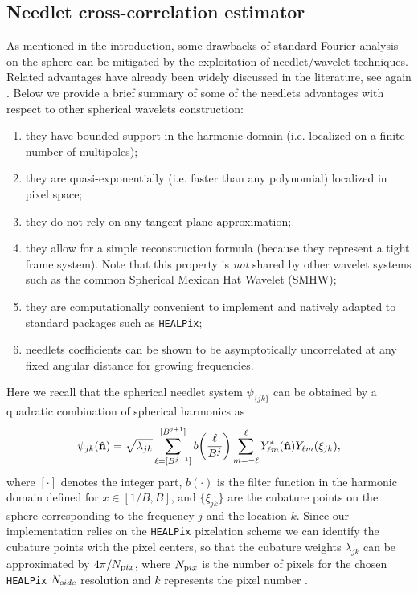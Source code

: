 
\subsection{Needlet cross-correlation estimator}
\label{subsec:needcorr}
As mentioned in the introduction, some drawbacks of standard Fourier analysis on the sphere can be mitigated by the exploitation of needlet/wavelet techniques. Related advantages have already been widely discussed in the literature, see again \cite{Marinucci2007,Lan2008,Donzelli2012,Troja2014,Marinucci2011,Durastanti2014}.
Below we provide a brief summary of some of the needlets advantages with respect to other spherical wavelets construction: 
%
\begin{enumerate}
\item{they have bounded support in the harmonic domain (i.e. localized on a finite number of multipoles);}
\item{they are quasi-exponentially (i.e. faster than any polynomial) localized in pixel space;}
\item{they do not rely on any tangent plane approximation;}
\item{they allow for a simple reconstruction formula (because they represent a tight frame system). Note that this property is \emph{not} shared by other wavelet systems such as the common Spherical Mexican Hat Wavelet (SMHW);}
\item{they are computationally convenient to implement and natively adapted to standard packages such as \texttt{HEALPix};}
\item{needlets coefficients can be shown to be asymptotically uncorrelated at any fixed angular distance for growing frequencies.}
\end{enumerate}
%
Here we recall that the spherical needlet system $\psi_{\{jk\}}$ can be obtained by a quadratic combination of spherical harmonics as
%
\begin{equation}
\label{eqn:needfunc}
\psi_{jk}(\nver) = \sqrt{\lambda_{jk}} \sum_{\ell=[B^{j-1}]}^{[B^{j+1}]} b\biggl(\frac{\ell}{B^{j}}\biggr)\sum_{m=-\ell}^{\ell}Y^*_{\ell m}(\nver)Y_{\ell m}(\xi_{jk}),
\end{equation}
%
where $[\cdot]$ denotes the integer part, $b(\cdot)$ is the filter function in the harmonic domain defined for $x\in [1/B,B]$, and $\{\xi_{jk}\}$ are the cubature points on the sphere corresponding to the frequency $j$ and the location $k$. Since our implementation relies on the \texttt{HEALPix} pixelation scheme we can identify the cubature points with the pixel centers, so that the cubature weights $\lambda_{jk}$ can be approximated by $4\pi/N_{\rm pix}$, where $N_{\rm pix}$ is the number of pixels for the chosen \texttt{HEALPix} $N_{\rm side}$ resolution and $k$ represents the pixel number \citep{Pietrobon2006}. 
 
